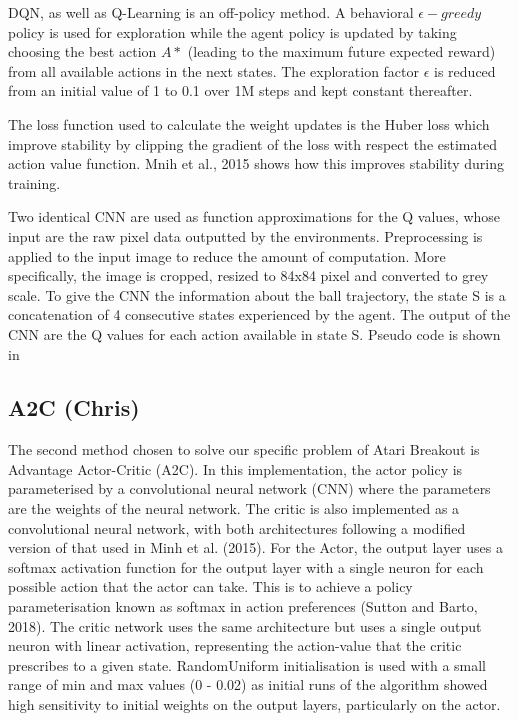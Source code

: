\documentclass{article}
\begin{document}
DQN, as well as Q-Learning is an off-policy method. A behavioral $\epsilon-greedy$ policy is used for exploration while the agent policy is updated by taking choosing the best action $A*$ (leading to the maximum future expected reward) from all available actions in the next states.
The exploration factor $\epsilon$ is reduced from an initial value of 1 to 0.1 over 1M steps and kept constant thereafter.

The loss function used to calculate the weight updates is the Huber loss which improve stability by clipping the gradient of the loss with respect the estimated action value function. Mnih et al., 2015 shows how this improves stability during training.

Two identical CNN are used as function approximations for the Q values, whose input are the raw pixel data outputted by the environments. Preprocessing is applied to the input image to reduce the amount of computation. More specifically, the image is cropped, resized to 84x84 pixel and converted to grey scale. To give the CNN the information about the ball trajectory, the state S is a concatenation of 4 consecutive states experienced by the agent. The output of the CNN are the Q values for each action available in state S.
Pseudo code is shown in 

\subsection{A2C (Chris)}

The second method chosen to solve our specific problem of Atari Breakout is Advantage Actor-Critic (A2C). In this implementation, the actor policy is parameterised by a convolutional neural network (CNN) where the parameters are the weights of the neural network. The critic is also implemented as a convolutional neural network, with both architectures following a modified version of that used in Minh et al. (2015). For the Actor, the output layer uses a softmax activation function for the output layer with a single neuron for each possible action that the actor can take. This is to achieve a policy parameterisation known as softmax in action preferences (Sutton and Barto, 2018). The critic network uses the same architecture but uses a single output neuron with linear activation, representing the action-value that the critic prescribes to a given state. RandomUniform initialisation is used with a small range of min and max values (0 - 0.02) as initial runs of the algorithm showed high sensitivity to initial weights on the output layers, particularly on the actor.
\end{document}
